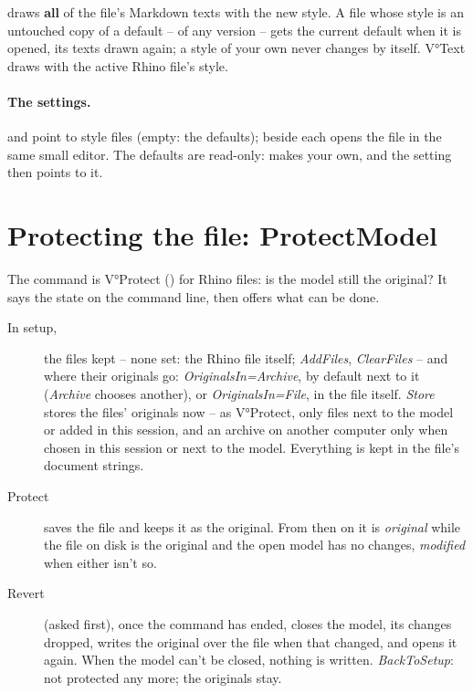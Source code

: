  draws \textbf{all} of the file's Markdown texts with the new style. A file whose style is an untouched copy of a
default -- of any version -- gets the current default when it is opened, its texts drawn again; a style of your own
never changes by itself. V°Text draws with the active Rhino file's style.

\paragraph{The settings.}  and  point to style
files (empty: the defaults);  beside each opens the file in the same small editor. The defaults are read-only:
 makes your own, and the setting then points to it.

\section{Protecting the file: ProtectModel}\label{sec:protectmodel}

The command  is V°Protect () for Rhino files: is the model still the original?
It says the state on the command line, then offers what can be done.

\begin{description}
  \item[In setup,] the files kept -- none set: the Rhino file itself; \emph{AddFiles}, \emph{ClearFiles} -- and where
        their originals go: \emph{OriginalsIn=Archive}, by default  next to it
        (\emph{Archive} chooses another), or \emph{OriginalsIn=File}, in the file itself. \emph{Store} stores the
        files' originals now -- as V°Protect, only files next to the model or added in this session, and an archive on
        another computer only when chosen in this session or next to the model. Everything is kept in the file's
        document strings.
  \item[Protect] saves the file and keeps it as the original. From then on it is \emph{original} while the file on
        disk is the original and the open model has no changes, \emph{modified} when either isn't so.
  \item[Revert] (asked first), once the command has ended, closes the model, its changes dropped, writes the original
        over the file when that changed, and opens it again. When the model can't be closed, nothing is written.
        \emph{BackToSetup}: not protected any more; the originals stay.
\end{description}

